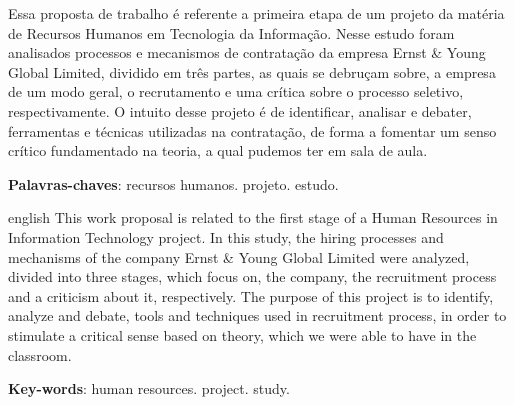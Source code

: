 
\setlength{\absparsep}{18pt} %
\begin{resumo}

 Essa proposta de trabalho é referente a primeira etapa de um projeto da matéria de Recursos Humanos em Tecnologia da Informação. Nesse estudo foram analisados processos e mecanismos de contratação da empresa Ernst & Young Global Limited, dividido em três partes, as quais se debruçam sobre, a empresa de um modo geral, o recrutamento e uma crítica sobre o processo seletivo, respectivamente. O intuito desse projeto é de identificar, analisar e debater, ferramentas e técnicas utilizadas na contratação, de forma a fomentar um senso crítico fundamentado na teoria, a qual pudemos ter em sala de aula.


 \textbf{Palavras-chaves}: recursos humanos. projeto. estudo.
\end{resumo}

\begin{resumo}[Abstract]
 \begin{otherlanguage*}{english}
This work proposal is related to the first stage of a Human Resources in Information Technology project. In this study, the hiring processes and mechanisms of the company Ernst & Young Global Limited were analyzed, divided into three stages, which focus on, the company, the recruitment process and a criticism about it, respectively. The purpose of this project is to identify, analyze and debate, tools and techniques used in recruitment process, in order to stimulate a critical sense based on theory, which we were able to have in the classroom.


   \vspace{\onelineskip}
 
   \noindent 
   \textbf{Key-words}: human resources. project. study.
 \end{otherlanguage*}
\end{resumo}